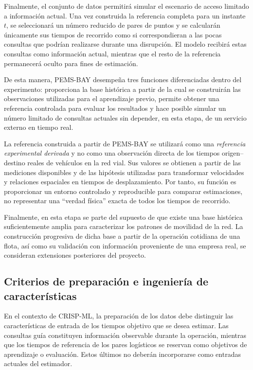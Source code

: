 \documentclass[11pt]{article}
\begin{document}
Finalmente, el conjunto de datos permitirá simular el escenario de acceso
limitado a información actual. Una vez construida la referencia completa para
un instante \(t\), se seleccionará un número reducido de pares de puntos y se
calcularán únicamente sus tiempos de recorrido como si correspondieran a las
pocas consultas que podrían realizarse durante una disrupción. El modelo
recibirá estas consultas como información actual, mientras que el resto de la
referencia permanecerá oculto para fines de estimación.

De esta manera, PEMS-BAY desempeña tres funciones diferenciadas dentro del
experimento: proporciona la base histórica a partir de la cual se construirán
las observaciones utilizadas para el aprendizaje previo, permite obtener una
referencia controlada para evaluar los resultados y hace posible simular un
número limitado de consultas actuales sin depender, en esta etapa, de un
servicio externo en tiempo real.

La referencia construida a partir de PEMS-BAY se utilizará como una
\textit{referencia experimental derivada} y no como una observación directa de
los tiempos origen--destino reales de vehículos en la red vial. Sus valores se
obtienen a partir de las mediciones disponibles y de las hipótesis utilizadas
para transformar velocidades y relaciones espaciales en tiempos de
desplazamiento. Por tanto, su función es proporcionar un entorno controlado y
reproducible para comparar estimaciones, no representar una ``verdad física''
exacta de todos los tiempos de recorrido.

Finalmente, en esta etapa se parte del supuesto de que existe una base
histórica suficientemente amplia para caracterizar los patrones de movilidad
de la red. La construcción progresiva de dicha base a partir de la operación
cotidiana de una flota, así como su validación con información proveniente de
una empresa real, se consideran extensiones posteriores del proyecto.


\subsection{Criterios de preparación e ingeniería de características}
\label{sec:preparacion}

En el contexto de CRISP-ML, la preparación de los datos debe distinguir las
características de entrada de los tiempos objetivo que se desea estimar. Las
consultas guía constituyen información observable durante la operación,
mientras que los tiempos de referencia de los pares logísticos se reservan
como objetivos de aprendizaje o evaluación. Estos últimos no deberán
incorporarse como entradas actuales del estimador.
\end{document}
